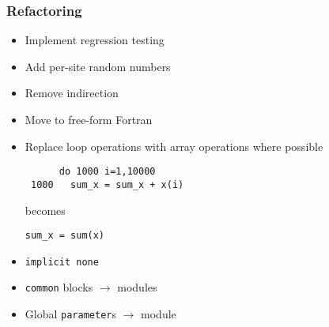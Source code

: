 \documentclass[handout]{beamer}
\begin{document}
\begin{frame}[fragile]
	\frametitle{Refactoring}

	\begin{itemize}[<+->]
		\item Implement regression testing
		\item Add per-site random numbers
		\item Remove indirection
		\item Move to free-form Fortran
		\item Replace loop operations with array operations where possible
		\begin{verbatim}
      do 1000 i=1,10000
 1000   sum_x = sum_x + x(i)
\end{verbatim}
becomes
\begin{verbatim}
sum_x = sum(x)
\end{verbatim}

		\item \verb|implicit none|
		\item \verb|common| blocks $\rightarrow$ modules
		\item Global \verb|parameter|s $\rightarrow$ module
	\end{itemize}
\end{frame}


\end{document}
